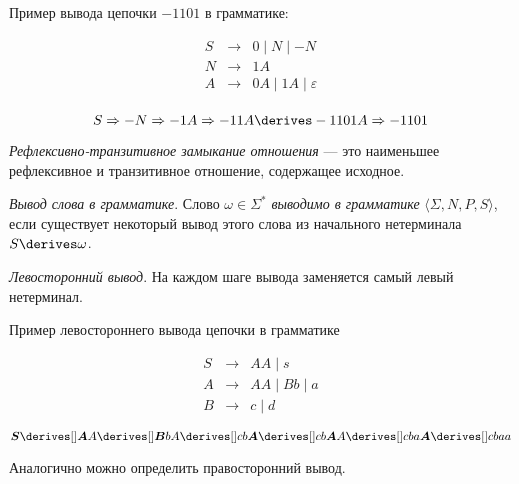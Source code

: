 \begin{example}
Пример вывода цепочки $-1101$ в грамматике:

  \[
  \begin{array}{rcl}
  S& \rightarrow & 0 \mid N \mid - N  \\
  N& \rightarrow & 1 A \\
  A& \rightarrow & 0 A \mid 1 A  \mid \varepsilon\\
  \end{array}
  \]

  \[ S \Rightarrow - N \Rightarrow - 1 A \Rightarrow - 1 1 A \derives - 1 1 0 1 A \Rightarrow - 1 1 0 1 \]
\end{example}






\begin{definition}
  \textit{Рефлексивно-транзитивное замыкание отношения} --- это наименьшее рефлексивное и транзитивное отношение, содержащее исходное.
  \end{definition}

\begin{definition}
\textit{Вывод слова в грамматике}. Слово $\omega \in \Sigma^*$ \textit{выводимо в грамматике} $\langle \Sigma, N, P, S \rangle$, если существует некоторый вывод этого слова из начального нетерминала $S \derives \omega$.

\end{definition}

\begin{definition}
\textit{Левосторонний вывод}. На каждом шаге вывода заменяется самый левый нетерминал.
\end{definition}

\begin{example}
Пример левостороннего вывода цепочки в грамматике

  \[
    \begin{array}{rcl}
    S& \rightarrow & A A \mid s  \\
    A& \rightarrow & A A \mid B b \mid a \\
    B& \rightarrow & c \mid d
    \end{array}
  \]

  \[ \boldsymbol{S} \derives[] \boldsymbol{A} A \derives[] \boldsymbol{B} b A \derives[] c b \boldsymbol{A} \derives[] c b \boldsymbol{A} A \derives[] c b a \boldsymbol{A} \derives[] c b a a \]
\end{example}

Аналогично можно определить правосторонний вывод.

